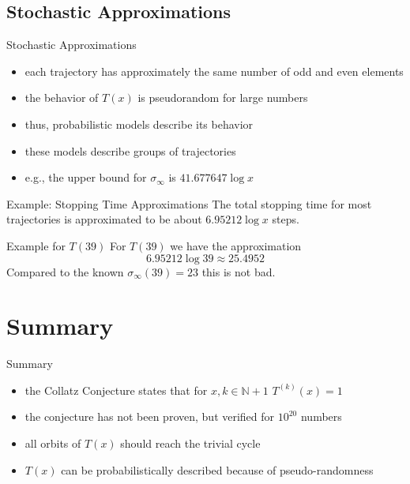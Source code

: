 \documentclass[hyperref={colorlinks,allcolors=black}]{beamer}
\begin{document}

\subsection[Approximations]{Stochastic Approximations}

\begin{frame}{Stochastic Approximations}
\begin{itemize}
    \item each trajectory has approximately the same number of odd and even 
        elements
    \item the behavior of $T(x)$ is pseudorandom for large numbers
    \item thus, probabilistic models describe its behavior
    \item these models describe groups of trajectories
    \item e.g., the upper bound for $\sigma_{\infty}$ is $41.677647 \log x$
\end{itemize}
\end{frame}


\begin{frame}{Example: Stopping Time Approximations}
The total stopping time for most trajectories is approximated to be about 
$6.95212 \log x$ steps.
\begin{block}{Example for $T(39)$}
For $T(39)$ we have the approximation
\begin{equation}\nonumber
    6.95212 \log 39 \approx 25.4952
\end{equation}
Compared to the known $\sigma_{\infty}(39)=23$ this is not bad.
\end{block}
\end{frame}


\section{Summary}

\begin{frame}{Summary}
\begin{itemize}
    \item the Collatz Conjecture states that for $x,k \in \mathbb{N} + 1$
        $T^{(k)}(x)=1$
    \item the conjecture has not been proven, but verified for $10^{20}$
        numbers
    \item all orbits of $T(x)$ should reach the trivial cycle
    \item $T(x)$ can be probabilistically described because of pseudo-randomness
\end{itemize}
\end{frame}
\end{document}
